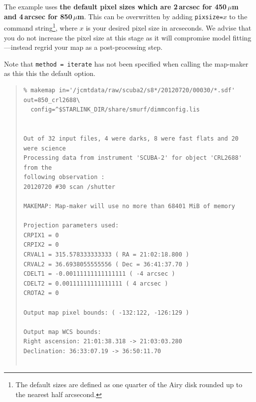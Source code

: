 \documentclass[twoside,11pt]{article}
\renewcommand{\_}{\texttt{\symbol{95}}}
\newenvironment{myquote}{\begin{quote}\begin{small}}{\end{small}\end{quote}}
\begin{document}
The example uses \textbf{the
default pixel sizes which are 2\,arcsec for 450\,$\mu$m and 4\,arcsec for
850\,$\mu$m}. This can be overwritten by adding \texttt{pixsize=}$x$ to the
command string\footnote{The default sizes are defined as one quarter
of the Airy disk rounded up to the nearest half arcsecond.}, where $x$
is your desired pixel size in arcseconds. We advise that you do not
increase the pixel size at this stage as it will compromise model
fitting---instead regrid your map as a post-processing step.

Note that \texttt{method = iterate} has not been specified when
calling the map-maker as this this the default option.

\begin{myquote}
\begin{verbatim}
% makemap in='/jcmtdata/raw/scuba2/s8*/20120720/00030/*.sdf' out=850_crl2688\
  config=^$STARLINK_DIR/share/smurf/dimmconfig.lis


Out of 32 input files, 4 were darks, 8 were fast flats and 20 were science
Processing data from instrument 'SCUBA-2' for object 'CRL2688' from the
following observation :
20120720 #30 scan /shutter

MAKEMAP: Map-maker will use no more than 68401 MiB of memory

Projection parameters used:
CRPIX1 = 0
CRPIX2 = 0
CRVAL1 = 315.578333333333 ( RA = 21:02:18.800 )
CRVAL2 = 36.6938055555556 ( Dec = 36:41:37.70 )
CDELT1 = -0.00111111111111111 ( -4 arcsec )
CDELT2 = 0.00111111111111111 ( 4 arcsec )
CROTA2 = 0

Output map pixel bounds: ( -132:122, -126:129 )

Output map WCS bounds:
Right ascension: 21:01:38.318 -> 21:03:03.280
Declination: 36:33:07.19 -> 36:50:11.70


\end{verbatim}
\end{myquote}
\end{document}
